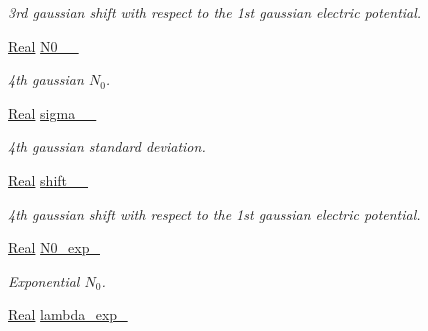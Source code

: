 \begin{DoxyCompactItemize}
\begin{DoxyCompactList}\small\item\em 3rd gaussian shift with respect to the 1st gaussian electric potential. \end{DoxyCompactList}\item 
\hypertarget{classParamList_aa65785f19373f13b7b3a5ef53480f3bb}{\hyperlink{typedefs_8h_a060b837c3b4486ee35317744156f3da2}{Real} \hyperlink{classParamList_aa65785f19373f13b7b3a5ef53480f3bb}{N0\-\_\-\_\-}}\label{classParamList_aa65785f19373f13b7b3a5ef53480f3bb}

\begin{DoxyCompactList}\small\item\em 4th gaussian $ N_0 $. \end{DoxyCompactList}\item 
\hypertarget{classParamList_ae484eb848d5c0716145e00c974ebecca}{\hyperlink{typedefs_8h_a060b837c3b4486ee35317744156f3da2}{Real} \hyperlink{classParamList_ae484eb848d5c0716145e00c974ebecca}{sigma\-\_\-\_\-}}\label{classParamList_ae484eb848d5c0716145e00c974ebecca}

\begin{DoxyCompactList}\small\item\em 4th gaussian standard deviation. \end{DoxyCompactList}\item 
\hypertarget{classParamList_a52a824700b094c4d0d908e052989931d}{\hyperlink{typedefs_8h_a060b837c3b4486ee35317744156f3da2}{Real} \hyperlink{classParamList_a52a824700b094c4d0d908e052989931d}{shift\-\_\-\_\-}}\label{classParamList_a52a824700b094c4d0d908e052989931d}

\begin{DoxyCompactList}\small\item\em 4th gaussian shift with respect to the 1st gaussian electric potential. \end{DoxyCompactList}\item 
\hypertarget{classParamList_ae7b7161db305f26c559d3f84bfaf5881}{\hyperlink{typedefs_8h_a060b837c3b4486ee35317744156f3da2}{Real} \hyperlink{classParamList_ae7b7161db305f26c559d3f84bfaf5881}{N0\-\_\-exp\-\_\-}}\label{classParamList_ae7b7161db305f26c559d3f84bfaf5881}

\begin{DoxyCompactList}\small\item\em Exponential $ N_0 $. \end{DoxyCompactList}\item 
\hypertarget{classParamList_a3a463067804bd2f46f24a111b172dc0f}{\hyperlink{typedefs_8h_a060b837c3b4486ee35317744156f3da2}{Real} \hyperlink{classParamList_a3a463067804bd2f46f24a111b172dc0f}{lambda\-\_\-exp\-\_\-}}\label{classParamList_a3a463067804bd2f46f24a111b172dc0f}


\end{DoxyCompactItemize}
